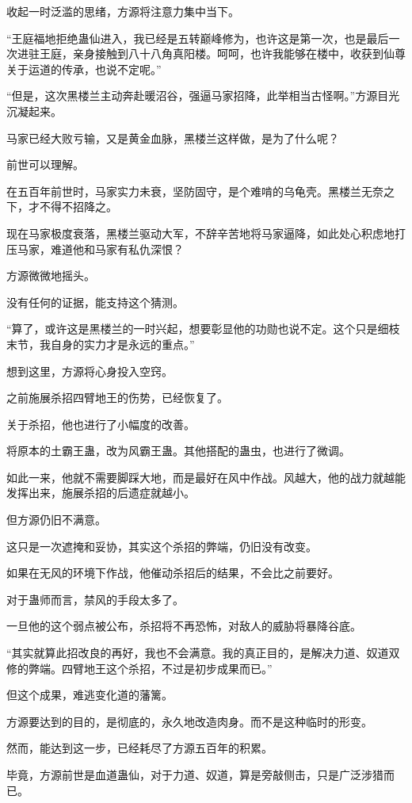 \begin{this_body}
收起一时泛滥的思绪，方源将注意力集中当下。

“王庭福地拒绝蛊仙进入，我已经是五转巅峰修为，也许这是第一次，也是最后一次进驻王庭，亲身接触到八十八角真阳楼。呵呵，也许我能够在楼中，收获到仙尊关于运道的传承，也说不定呢。”

“但是，这次黑楼兰主动奔赴暖沼谷，强逼马家招降，此举相当古怪啊。”方源目光沉凝起来。

马家已经大败亏输，又是黄金血脉，黑楼兰这样做，是为了什么呢？

前世可以理解。

在五百年前世时，马家实力未衰，坚防固守，是个难啃的乌龟壳。黑楼兰无奈之下，才不得不招降之。

现在马家极度衰落，黑楼兰驱动大军，不辞辛苦地将马家逼降，如此处心积虑地打压马家，难道他和马家有私仇深恨？

方源微微地摇头。

没有任何的证据，能支持这个猜测。

“算了，或许这是黑楼兰的一时兴起，想要彰显他的功勋也说不定。这个只是细枝末节，我自身的实力才是永远的重点。”

想到这里，方源将心身投入空窍。

之前施展杀招四臂地王的伤势，已经恢复了。

关于杀招，他也进行了小幅度的改善。

将原本的土霸王蛊，改为风霸王蛊。其他搭配的蛊虫，也进行了微调。

如此一来，他就不需要脚踩大地，而是最好在风中作战。风越大，他的战力就越能发挥出来，施展杀招的后遗症就越小。

但方源仍旧不满意。

这只是一次遮掩和妥协，其实这个杀招的弊端，仍旧没有改变。

如果在无风的环境下作战，他催动杀招后的结果，不会比之前要好。

对于蛊师而言，禁风的手段太多了。

一旦他的这个弱点被公布，杀招将不再恐怖，对敌人的威胁将暴降谷底。

“其实就算此招改良的再好，我也不会满意。我的真正目的，是解决力道、奴道双修的弊端。四臂地王这个杀招，不过是初步成果而已。”

但这个成果，难逃变化道的藩篱。

方源要达到的目的，是彻底的，永久地改造肉身。而不是这种临时的形变。

然而，能达到这一步，已经耗尽了方源五百年的积累。

毕竟，方源前世是血道蛊仙，对于力道、奴道，算是旁敲侧击，只是广泛涉猎而已。


\end{this_body}
